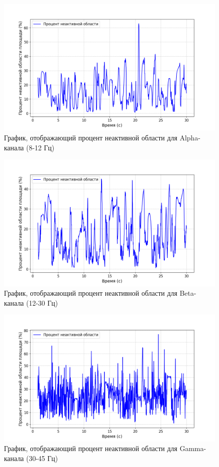     \begin{figure}[ht]
        \centering
        \includegraphics[width=1\textwidth]{images/alpha_graphic.png}
        \caption{График, отображающий процент неактивной области для Alpha-канала (8-12 Гц)}
        \label{fig:alpha_graphic}
    \end{figure}
    \begin{figure}[ht]
        \centering
        \includegraphics[width=1\textwidth]{images/beta_graphic.png}
        \caption{График, отображающий процент неактивной области для Beta-канала (12-30 Гц)}
        \label{fig:beta_graphic}
    \end{figure}
    \begin{figure}[ht]
        \centering
        \includegraphics[width=1\textwidth]{images/gamma_graphic.png}
        \caption{График, отображающий процент неактивной области для Gamma-канала (30-45 Гц)}
        \label{fig:gamma_graphic}
    \end{figure}
    
